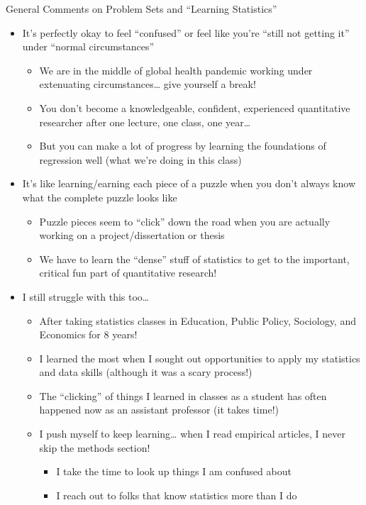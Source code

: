 \documentclass[
  8pt,
  ignorenonframetext,
  dvipsnames]{beamer}
\providecommand{\tightlist}{%
  \setlength{\itemsep}{0pt}\setlength{\parskip}{0pt}}
\let\olditem\item
\renewcommand{\item}{%
  \olditem\vspace{4pt}
}
\begin{document}
\begin{frame}{General Comments on Problem Sets and ``Learning
Statistics''}
\protect\hypertarget{general-comments-on-problem-sets-and-learning-statistics}{}

\begin{itemize}
\tightlist
\item
  It's perfectly okay to feel ``confused'' or feel like you're ``still
  not getting it'' under ``normal circumstances''

  \begin{itemize}
  \tightlist
  \item
    We are in the middle of global health pandemic working under
    extenuating circumstances\ldots{} give yourself a break!
  \item
    You don't become a knowledgeable, confident, experienced
    quantitative researcher after one lecture, one class, one
    year\ldots{}
  \item
    But you can make a lot of progress by learning the foundations of
    regression well (what we're doing in this class)
  \end{itemize}
\item
  It's like learning/earning each piece of a puzzle when you don't
  always know what the complete puzzle looks like

  \begin{itemize}
  \tightlist
  \item
    Puzzle pieces seem to ``click'' down the road when you are actually
    working on a project/dissertation or thesis
  \item
    We have to learn the ``dense'' stuff of statistics to get to the
    important, critical fun part of quantitative research!
  \end{itemize}
\item
  I still struggle with this too\ldots{}

  \begin{itemize}
  \tightlist
  \item
    After taking statistics classes in Education, Public Policy,
    Sociology, and Economics for 8 years!
  \item
    I learned the most when I sought out opportunities to apply my
    statistics and data skills (although it was a scary process!)
  \item
    The ``clicking'' of things I learned in classes as a student has
    often happened now as an assistant professor (it takes time!)
  \item
    I push myself to keep learning\ldots{} when I read empirical
    articles, I never skip the methods section!

    \begin{itemize}
    \tightlist
    \item
      I take the time to look up things I am confused about
    \item
      I reach out to folks that know statistics more than I do
    \end{itemize}
  \end{itemize}
\end{itemize}

\end{frame}
\end{document}

